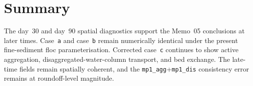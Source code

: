 \documentclass[11pt]{article}
\begin{document}
\section*{Summary}

The day~30 and day~90 spatial diagnostics support the Memo~05 conclusions at
later times.  Case~\texttt{a} and case~\texttt{b} remain numerically identical
under the present fine-sediment floc parameterisation.  Corrected
case~\texttt{c} continues to show active aggregation, disaggregated-water-column
transport, and bed exchange.  The late-time fields remain spatially coherent,
and the \texttt{mp1\_agg}+\texttt{mp1\_dis} consistency error remains at
roundoff-level magnitude.
\end{document}
